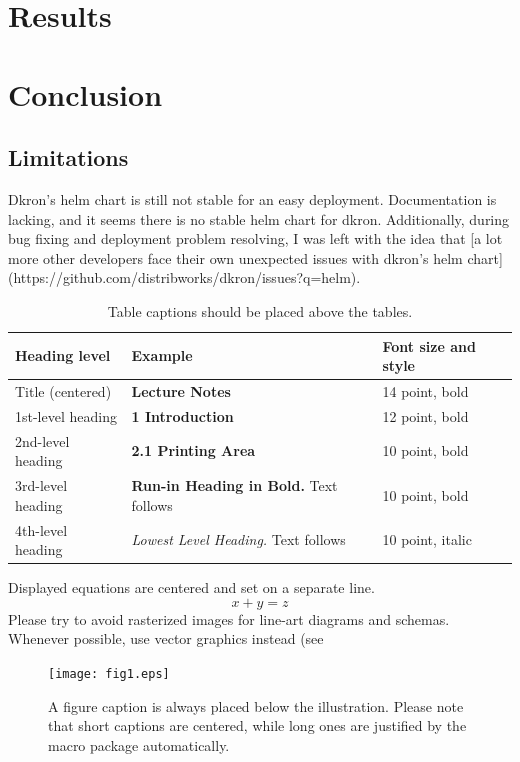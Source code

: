 \documentclass[runningheads]{llncs}
\begin{document}
\section{Results}
\label{results}
\section{Conclusion}
\label{conclusion}

\subsection{Limitations}
Dkron's helm chart is still not stable for an easy deployment. Documentation is lacking, and
it seems there is no stable helm chart for dkron. Additionally, during bug fixing and deployment
problem resolving, I was left with the idea that [a lot more other developers face their own
unexpected issues with dkron's helm chart](https://github.com/distribworks/dkron/issues?q=helm).



\begin{table}
\caption{Table captions should be placed above the
tables.}\label{tab1}
\begin{tabular}{|l|l|l|}
\hline
Heading level &  Example & Font size and style\\
\hline
Title (centered) &  {\Large\bfseries Lecture Notes} & 14 point, bold\\
1st-level heading &  {\large\bfseries 1 Introduction} & 12 point, bold\\
2nd-level heading & {\bfseries 2.1 Printing Area} & 10 point, bold\\
3rd-level heading & {\bfseries Run-in Heading in Bold.} Text follows & 10 point, bold\\
4th-level heading & {\itshape Lowest Level Heading.} Text follows & 10 point, italic\\
\hline
\end{tabular}
\end{table}


\noindent Displayed equations are centered and set on a separate
line.
\begin{equation}
x + y = z
\end{equation}
Please try to avoid rasterized images for line-art diagrams and
schemas. Whenever possible, use vector graphics instead (see

\begin{figure}
\texttt{[image: fig1.eps]}
\caption{A figure caption is always placed below the illustration.
Please note that short captions are centered, while long ones are
justified by the macro package automatically.} \label{fig1}
\end{figure}
\end{document}
